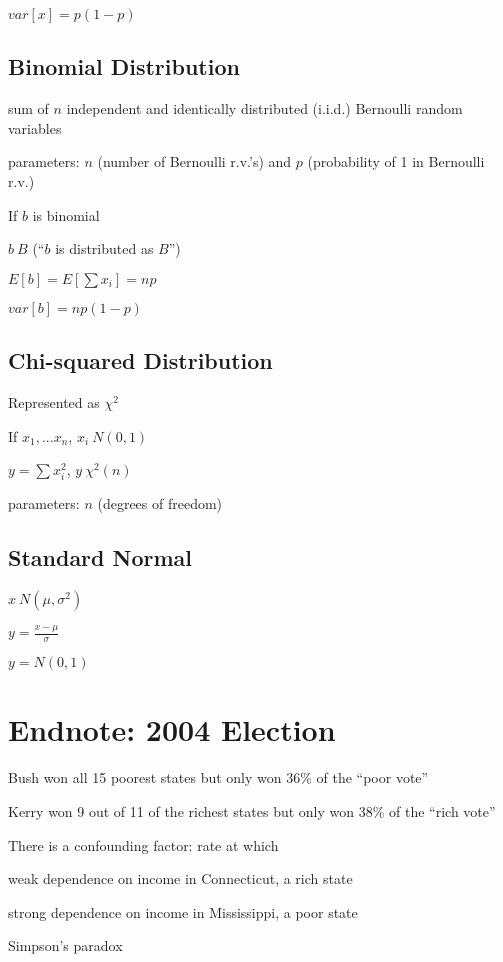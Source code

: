 \documentclass[twoside]{article}
\def\beginrefs{\begin{list}%
        {[\arabic{equation}]}{\usecounter{equation}
         \setlength{\leftmargin}{2.0truecm}\setlength{\labelsep}{0.4truecm}%
         \setlength{\labelwidth}{1.6truecm}}}
\def\endrefs{\end{list}}
\def\bibentry#1{\item[\hbox{[#1]}]}
\begin{document}
$var[x] = p(1-p)$

\subsection{Binomial Distribution}

sum of $n$ independent and identically distributed (i.i.d.) Bernoulli random variables

parameters: $n$ (number of Bernoulli r.v.'s) and $p$ (probability of 1 in Bernoulli r.v.)

If $b$ is binomial

$b ~ B$ (``$b$ is distributed as $B$'')

$E[b] = E[\sum x_i] = np$

$var[b] = np(1-p)$

\subsection{Chi-squared Distribution}

Represented as $\chi^2$

If $x_1,...x_n$, $x_i ~ N(0,1)$

$y = \sum x_i^2$, $y ~ \chi^2 (n)$ 

parameters: $n$ (degrees of freedom)

\subsection{Standard Normal}

$x ~ N(\mu, \sigma^2)$

$y = \frac{x-\mu}{\sigma}$

$y = N(0,1)$

\section{Endnote: 2004 Election}

Bush won all 15 poorest states but only won 36\% of the ``poor vote''

Kerry won 9 out of 11 of the richest states but only won 38\% of the ``rich vote''

There is a confounding factor: rate at which

weak dependence on income in Connecticut, a rich state

strong dependence on income in Mississippi, a poor state

Simpson's paradox


\end{document}
